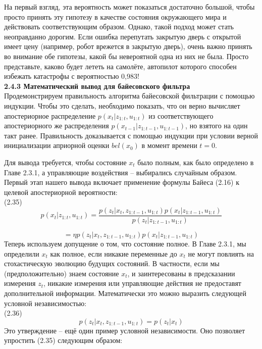 \documentclass[10pt,a4paper]{article}
\begin{document}
 На первый взгляд, эта вероятность может показаться достаточно большой, чтобы просто принять эту гипотезу в качестве состояния окружающего мира и действовать соответствующим образом. Однако, такой подход может стать неоправданно дорогим. Если ошибка перепутать закрытую дверь с открытой имеет цену (например, робот врежется в закрытую дверь), очень важно принять во внимание обе гипотезы, какой бы невероятной одна из них не была. Просто представьте, каково будет лететь на самолёте, автопилот которого способен избежать катастрофы с вероятностью 0,983!\\

 \textbf{ 2.4.3 Математический вывод для байесовского фильтра}\\
 
 Продемонстрируем правильность алгоритма байесовской фильтрации с помощью индукции. Чтобы это сделать, необходимо показать, что он верно вычисляет апостериорное распределение $p(x_t | z_{1:t}, u_{1:t})$ из соответствующего апостериорного же распределения $p(x_{t-1} | z_{1:t-1}, u_{1:t-1})$, но взятого на один такт ранее. Правильность доказывается с помощью индукции при условии верной инициализации априорной оценки $bel(x_0)$ в момент времени $t = 0$.
 
 Для вывода требуется, чтобы состояние $x_t$ было полным, как было определено в Главе 2.3.1, а управляющие воздействия – выбирались случайным образом. Первый этап нашего вывода включает применение формулы Байеса (2.16) к целевой апостериорной вероятности:\\
 
 (2.35)$$p(x_t | z_{1:t}, u_{1:t}) = \frac{p(z_t | x_t, z_{1:t-1}, u_{1:t}) p(x_t | z_{1:t-1}, u_{1:t})}{p(z_t | z_{1:t-1}, u_{1:t})}$$
 
 $$=\eta p(z_t | x_t, z_{1:t-1}, u_{1:t}) p(x_t | z_{1:t-1}, u_{1:t})$$
 Теперь используем допущение о том, что состояние полное. В Главе 2.3.1, мы определили $x_t$ как полное, если никакие переменные до $x_t$ не могут повлиять на стохастическую эволюцию будущих состояний. В частности, если мы (предположительно) знаем состояние $x_t$, и заинтересованы в предсказании измерения $z_t$, никакие измерения или управляющие действия  не предоставят дополнительной информации. Математически это можно выразить следующей условной независимостью:\\
 
 (2.36) $$p(z_t | x_t, z_{1:t-1}, u_{1:t}) = p(z_t | x_t)$$
 Это утверждение – ещё один пример условной независимости. Оно позволяет упростить (2.35) следующим образом:\\
 
\end{document}

